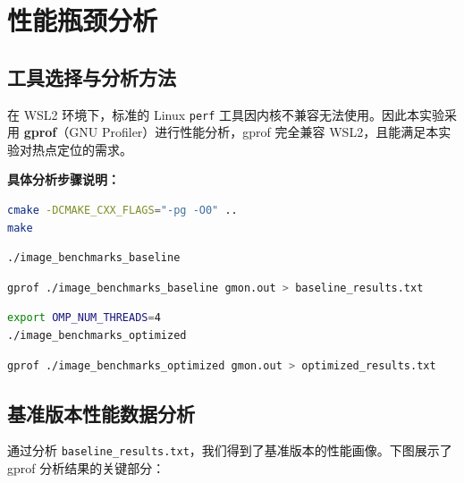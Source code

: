 \documentclass[a4paper]{article}
\begin{document}
\section{性能瓶颈分析}

\subsection{工具选择与分析方法}

在 WSL2 环境下，标准的 Linux \texttt{perf} 工具因内核不兼容无法使用。因此本实验采用 \textbf{gprof}（GNU Profiler）进行性能分析，gprof 完全兼容 WSL2，且能满足本实验对热点定位的需求。

\textbf{具体分析步骤说明：}

\begin{lstlisting}[language=bash]
cmake -DCMAKE_CXX_FLAGS="-pg -O0" ..
make
\end{lstlisting}
\begin{lstlisting}[language=bash]
./image_benchmarks_baseline
\end{lstlisting}
\begin{lstlisting}[language=bash]
gprof ./image_benchmarks_baseline gmon.out > baseline_results.txt
\end{lstlisting}
\begin{lstlisting}[language=bash]
export OMP_NUM_THREADS=4
./image_benchmarks_optimized
\end{lstlisting}
\begin{lstlisting}[language=bash]
gprof ./image_benchmarks_optimized gmon.out > optimized_results.txt
\end{lstlisting}

\subsection{基准版本性能数据分析}

通过分析 \texttt{baseline\_results.txt}，我们得到了基准版本的性能画像。下图展示了 gprof 分析结果的关键部分：
\end{document}
